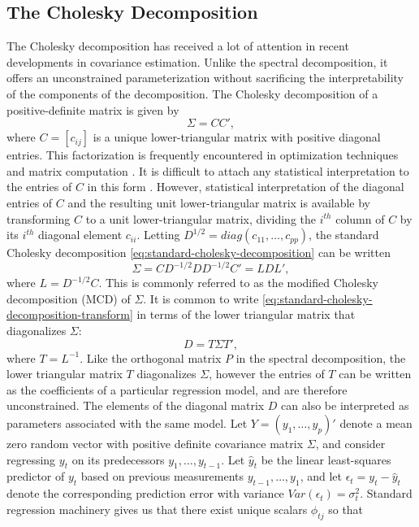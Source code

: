 \subsection{The Cholesky Decomposition} \label{chapter-1-cholesky-decomposition}

The Cholesky decomposition has received a lot of attention in recent developments in covariance estimation. Unlike the spectral decomposition, it offers an unconstrained parameterization without sacrificing the interpretability of the components of the decomposition. The Cholesky decomposition of a positive-definite matrix is given by
\begin{equation}\label{eq:standard-cholesky-decomposition}
\Sigma = CC',
\end{equation}
\noindent
where $C = \left[c_{ij} \right]$ is a unique lower-triangular matrix with positive diagonal entries. This factorization is frequently encountered in optimization techniques and matrix computation \citep{golub2012matrix}. It is difficult to attach any statistical interpretation to the entries of $C$ in this form \citep{pinheiro1996unconstrained}. However, statistical interpretation of the diagonal entries of $C$ and the resulting unit lower-triangular matrix is available by transforming $C$ to a unit lower-triangular matrix, dividing the $i^{th}$ column of $C$ by its $i^{th}$ diagonal element $c_{ii}$. Letting $D^{1/2} = diag\left( c_{11},\dots, c_{pp} \right)$, the standard Cholesky decomposition \eqref{eq:standard-cholesky-decomposition} can be written
\begin{equation}\label{eq:standard-cholesky-decomposition-transform}
\Sigma = CD^{-1/2}DD^{-1/2}C' = L D L',
\end{equation}
\noindent
where $L = D^{-1/2}C$. This is commonly referred to as the modified Cholesky decomposition (MCD) of $\Sigma$. It is common to write \eqref{eq:standard-cholesky-decomposition-transform} in terms of the lower triangular matrix that diagonalizes $\Sigma$:
\begin{equation}\label{eq:modified-cholesky-decomposition}
D = T\Sigma T',
\end{equation}
 \noindent
where $T = L^{-1}$. Like the orthogonal matrix $P$ in the spectral decomposition, the lower triangular matrix $T$ diagonalizes $\Sigma$, however the entries of $T$ can be written as the coefficients of a particular regression model, and are therefore unconstrained. The elements of the diagonal matrix $D$ can also be interpreted as parameters associated with the same model. Let $Y = \left( y_1,\dots, y_p \right)'$ denote a mean zero random vector with positive definite covariance matrix $\Sigma$, and consider regressing $y_t$ on its predecessors $y_1, \dots, y_{t-1}$. Let $\hat{y}_t$ be the linear least-squares predictor of $y_t$ based on previous measurements $y_{t-1}, \dots , y_1$, and let $\epsilon_t = y_t - \hat{y}_t$ denote the corresponding prediction error with variance $Var\left(\epsilon_t\right) = \sigma_t^2$. Standard regression machinery gives us that there exist unique scalars $\phi_{tj}$ so that
